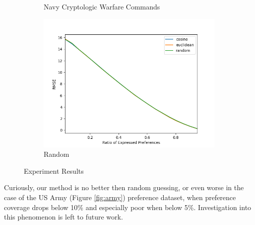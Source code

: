\begin{figure}
\begin{subfigure}{.5\textwidth}
  \caption{Navy Cryptologic Warfare Commands}
  \label{fig:cw_o}
\end{subfigure}
\begin{subfigure}{.5\textwidth}
  \centering
  \includegraphics[width=.8\linewidth]{Sections/Plots/random.png}
  \caption{Random}
  \label{fig:random}
\end{subfigure}
\caption{Experiment Results}
\label{fig:fig}
\end{figure}

Curiously, our method is no better then random guessing, or even worse in the case of the US Army (Figure \ref{fig:army}) preference dataset, when preference coverage drops below 10\% and especially poor when below 5\%. Investigation into this phenomenon is left to future work. 

